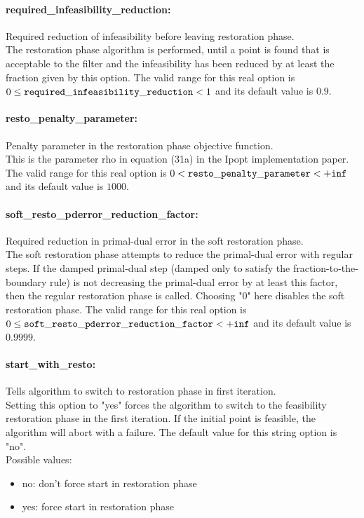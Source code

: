 \paragraph{required\_infeasibility\_reduction:}\label{sec:required_infeasibility_reduction} Required reduction of infeasibility before leaving restoration phase. $\;$ \\
 The restoration phase algorithm is performed,
until a point is found that is acceptable to the
filter and the infeasibility has been reduced by
at least the fraction given by this option. The valid range for this real option is 
$0 \le {\tt required\_infeasibility\_reduction } <  1$
and its default value is $0.9$.


\paragraph{resto\_penalty\_parameter:}\label{sec:resto_penalty_parameter} Penalty parameter in the restoration phase objective function. $\;$ \\
 This is the parameter rho in equation (31a) in
the Ipopt implementation paper. The valid range for this real option is 
$0 <  {\tt resto\_penalty\_parameter } <  {\tt +inf}$
and its default value is $1000$.


\paragraph{soft\_resto\_pderror\_reduction\_factor:}\label{sec:soft_resto_pderror_reduction_factor} Required reduction in primal-dual error in the soft restoration phase. $\;$ \\
 The soft restoration phase attempts to reduce the
primal-dual error with regular steps. If the
damped primal-dual step (damped only to satisfy
the fraction-to-the-boundary rule) is not
decreasing the primal-dual error by at least this
factor, then the regular restoration phase is
called. Choosing "0" here disables the soft
restoration phase. The valid range for this real option is 
$0 \le {\tt soft\_resto\_pderror\_reduction\_factor } <  {\tt +inf}$
and its default value is $0.9999$.


\paragraph{start\_with\_resto:}\label{sec:start_with_resto} Tells algorithm to switch to restoration phase in first iteration. $\;$ \\
 Setting this option to "yes" forces the algorithm
to switch to the feasibility restoration phase in
the first iteration. If the initial point is
feasible, the algorithm will abort with a failure.
The default value for this string option is "no".
\\ 
Possible values:
\begin{itemize}
   \item no: don't force start in restoration phase
   \item yes: force start in restoration phase
\end{itemize}

